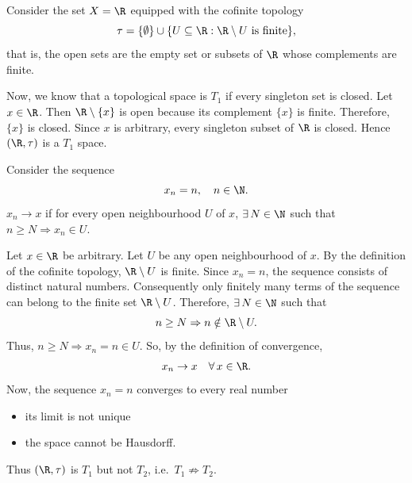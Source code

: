 
Consider the set $X=\R$ equipped with the cofinite topology
\[ \tau=\{\emptyset\}\cup\{U\subseteq\R : \R\setminus U \text{ is finite}\}, \]
that is, the open sets are the empty set or subsets of $\R$ whose complements are finite.

Now, we know that a topological space is $T_1$ if every singleton set is closed.
Let $x\in\R$. Then $\R\setminus\{x\}$ is open because its complement $\{x\}$ is finite.
Therefore, $\{x\}$ is closed. Since $x$ is arbitrary, every singleton subset of $\R$ is closed.
Hence $(\R,\tau)$ is a $T_1$ space.

Consider the sequence
\[ x_n=n,\quad n\in\N. \]
$x_n\to x$ if for every open neighbourhood $U$ of $x$, $\exists\,N\in\N$ such that
$n\ge N\Rightarrow x_n\in U$.

Let $x\in\R$ be arbitrary. Let $U$ be any open neighbourhood of $x$. By the definition of the
cofinite topology, $\R\setminus U$ is finite. Since $x_n=n$, the sequence consists of distinct
natural numbers. Consequently only finitely many terms of the sequence can belong to the finite
set $\R\setminus U$. Therefore, $\exists\,N\in\N$ such that
\[ n\ge N\Rightarrow n\notin\R\setminus U. \]
Thus, $n\ge N\Rightarrow x_n=n\in U$. So, by the definition of convergence,
\[ x_n\to x\quad\forall\,x\in\R. \]
Now, the sequence $x_n=n$ converges to every real number
\begin{itemize}
  \item[$\Rightarrow$] its limit is not unique
  \item[$\Rightarrow$] the space cannot be Hausdorff.
\end{itemize}
Thus $(\R,\tau)$ is $T_1$ but not $T_2$, i.e.\ $T_1\not\Rightarrow T_2$.
